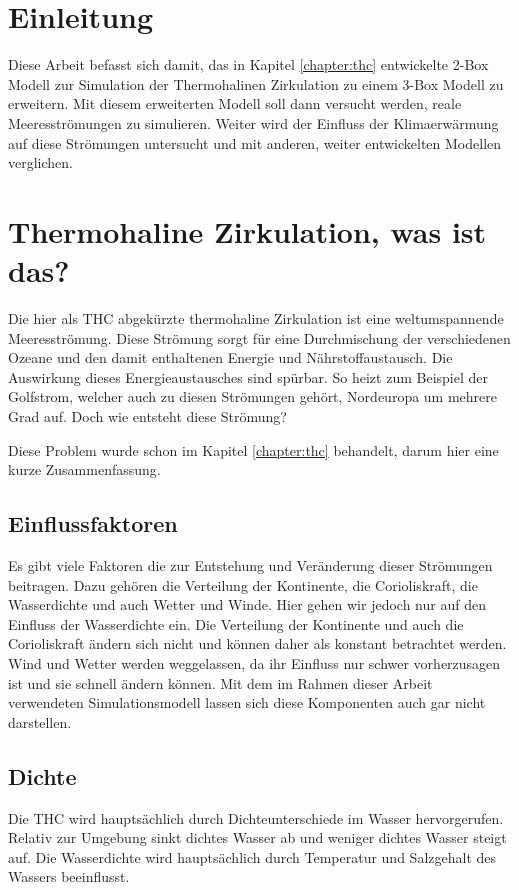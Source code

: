 \section{Einleitung}

Diese Arbeit befasst sich damit, das in Kapitel \ref{chapter:thc} entwickelte 2-Box Modell zur Simulation der Thermohalinen Zirkulation zu einem 3-Box Modell zu erweitern. Mit diesem erweiterten Modell soll dann versucht werden, reale Meeresströmungen zu simulieren. Weiter wird der Einfluss der Klimaerwärmung auf diese Strömungen untersucht und mit anderen, weiter entwickelten Modellen verglichen.

\section{Thermohaline Zirkulation, was ist das?}

Die hier als THC abgekürzte thermohaline Zirkulation ist eine weltumspannende Meeresströmung.
Diese Strömung sorgt für eine Durchmischung der verschiedenen Ozeane und den damit enthaltenen Energie und Nährstoffaustausch. 
Die Auswirkung dieses Energieaustausches sind spürbar. So heizt zum Beispiel der Golfstrom, welcher auch zu diesen Strömungen gehört, Nordeuropa um mehrere Grad auf.
Doch wie entsteht diese Strömung? 

Diese Problem wurde schon im Kapitel \ref{chapter:thc} behandelt, darum hier eine kurze Zusammenfassung. 



\subsection{Einflussfaktoren}
Es gibt viele Faktoren die zur Entstehung und Veränderung dieser Strömungen beitragen. Dazu gehören die Verteilung der Kontinente, die Corioliskraft, die Wasserdichte und auch Wetter und Winde. Hier gehen wir jedoch nur auf den Einfluss der Wasserdichte ein.
Die Verteilung der Kontinente und auch die Corioliskraft ändern sich nicht und können daher als konstant betrachtet werden. Wind und Wetter werden weggelassen, da ihr Einfluss nur schwer vorherzusagen ist und sie schnell ändern können. Mit dem im Rahmen dieser Arbeit verwendeten Simulationsmodell lassen sich diese Komponenten auch gar nicht darstellen.

\subsection{Dichte}
Die THC wird hauptsächlich durch Dichteunterschiede im Wasser hervorgerufen.
Relativ zur Umgebung sinkt dichtes Wasser ab und weniger dichtes Wasser steigt auf. Die Wasserdichte wird hauptsächlich durch Temperatur und Salzgehalt des Wassers beeinflusst.

